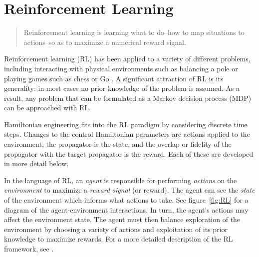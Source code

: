 
\section{Reinforcement Learning}


\begin{quote}
    Reinforcement learning is learning what to do--how to map situations to actions--so as to maximize a numerical reward signal. \cite{sutton2018reinforcement}
\end{quote}
Reinforcement learning  (RL) has been applied to a variety of different problems, including interacting with physical environments such as balancing a pole \cite{lillicrap2015continuous} or playing games such as chess or Go \cite{Silver1140}. A significant attraction of RL is its generality: in most cases no prior knowledge of the problem is assumed. As a result, any problem that can be formulated as a Markov decision process (MDP) can be approached with RL.

Hamiltonian engineering fits into the RL paradigm by considering discrete time steps. Changes to the control Hamiltonian parameters are actions applied to the environment, the propagator is the state, and the overlap or fidelity of the propagator with the target propagator is the reward.  Each of these are developed in more detail below.


In the language of RL, an \emph{agent} is responsible for performing \emph{actions} on the \emph{environment} to maximize a \emph{reward signal} (or reward). The agent can see the \emph{state} of the environment which informs what actions to take. See figure~\ref{fig:RL} for a diagram of the agent-environment interactions. In turn, the agent's actions may affect the environment state. The agent must then balance exploration of the environment by choosing a variety of actions and exploitation of its prior knowledge to maximize rewards.
For a more detailed description of the RL framework, see \cite{sutton2018reinforcement}.

